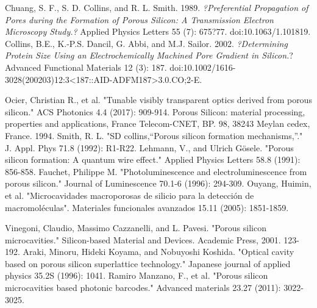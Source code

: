 \documentclass[a4paper,11pt,]{book}
\begin{document}
{\begin{thebibliography}{X}
 Chuang, S. F., S. D. Collins, and R. L. Smith. 1989.\emph{ ?Preferential Propagation of Pores during the Formation of Porous Silicon: A Transmission Electron Microscopy Study.?} Applied Physics Letters 55 (7): 675?77. doi:10.1063/1.101819.
 Collins, B.E., K.-P.S. Dancil, G. Abbi, and M.J. Sailor. 2002. \emph{?Determining Protein Size Using an Electrochemically Machined Pore Gradient in Silicon.}? Advanced Functional Materials 12 (3): 187. doi:10.1002/1616-3028(200203)12:3<187::AID-ADFM187>3.0.CO;2-E.

Ocier, Christian R., et al. "Tunable visibly transparent optics derived from porous silicon." ACS Photonics 4.4 (2017): 909-914.
Porous Silicon: material processing, properties and applications, France Telecom-CNET, BP. 98, 38243 Meylan cedex, France. 1994.
 Smith, R. L. "SD collins,“Porous silicon formation mechanisms,”." J. Appl. Phys 71.8 (1992): R1-R22.
Lehmann, V., and Ulrich Gösele. "Porous silicon formation: A quantum wire effect." Applied Physics Letters 58.8 (1991): 856-858.
 Fauchet, Philippe M. "Photoluminescence and electroluminescence from porous silicon." Journal of Luminescence 70.1-6 (1996): 294-309.
 Ouyang, Huimin, et al. "Microcavidades macroporosas de silicio para la detección de macromoléculas". Materiales funcionales avanzados 15.11 (2005): 1851-1859.

 Vinegoni, Claudio, Massimo Cazzanelli, and L. Pavesi. "Porous silicon microcavities." Silicon-based Material and Devices. Academic Press, 2001. 123-192.
Araki, Minoru, Hideki Koyama, and Nobuyoshi Koshida. "Optical cavity based on porous silicon superlattice technology." Japanese journal of applied physics 35.2S (1996): 1041.
 Ramiro Manzano, F., et al. "Porous silicon microcavities based photonic barcodes." Advanced materials 23.27 (2011): 3022-3025.


\end{thebibliography}}
\end{document}
